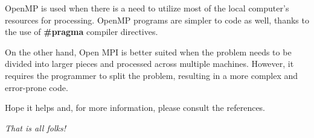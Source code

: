 		\par OpenMP is used when there is a need to utilize most of the local computer's resources for processing. OpenMP programs are simpler to code as well, thanks to the use of \textbf{\#pragma} compiler directives.
		
		\par On the other hand, Open MPI is better suited when the problem needs to be divided into larger pieces and processed across multiple machines. However, it requires the programmer to split the problem, resulting in a more complex and error-prone code.
		
		\par Hope it helps and, for more information, please consult the references.\newline
		
		\par \textit{That is all folks!}
	
	
	

